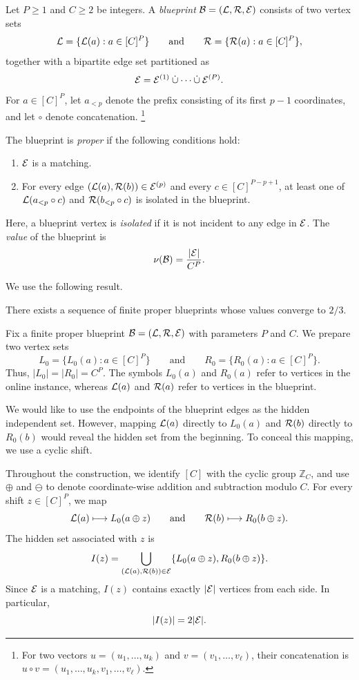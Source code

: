 \begin{definition}
Let $P\ge 1$ and $C\ge 2$ be integers. A \emph{blueprint} $\mathcal{B}=(\mathcal{L},\mathcal{R},\mathcal{E})$ consists of two vertex sets
$$
\mathcal{L}=\{\mathcal{L}(a):a\in[C]^P\}
\qquad\text{and}\qquad
\mathcal{R}=\{\mathcal{R}(a):a\in[C]^P\},
$$
together with a bipartite edge set partitioned as
$$
\mathcal{E}
=
\mathcal{E}^{(1)}
\mathbin{\dot{\cup}}
\cdots
\mathbin{\dot{\cup}}
\mathcal{E}^{(P)}.
$$
For $a\in[C]^P$, let $a_{<p}$ denote the prefix consisting of its first $p-1$ coordinates, and let $\circ$ denote concatenation. \footnote{For two vectors $u=(u_1,\ldots,u_k)$ and $v=(v_1,\ldots,v_\ell)$, their concatenation is $u\circ v=(u_1,\ldots,u_k,v_1,\ldots,v_\ell)$.}

The blueprint is \emph{proper} if the following conditions hold:
\begin{enumerate}
    \item $\mathcal{E}$ is a matching.
    
    \item For every edge $(\mathcal{L}(a),\mathcal{R}(b))\in\mathcal{E}^{(p)}$ and every $c\in[C]^{P-p+1}$, at least one of $\mathcal{L}(a_{<p}\circ c)$ and $\mathcal{R}(b_{<p}\circ c)$ is isolated in the blueprint.
\end{enumerate}
Here, a blueprint vertex is \emph{isolated} if it is not incident to any edge in $\mathcal{E}$. The \emph{value} of the blueprint is
$$
\nu(\mathcal{B})=\frac{|\mathcal{E}|}{C^P}.
$$
\end{definition}

We use the following result.

\begin{theorem}
\label{thm:blueprint}
There exists a sequence of finite proper blueprints whose values converge to $2/3$.
\end{theorem}

Fix a finite proper blueprint $\mathcal{B}=(\mathcal{L},\mathcal{R},\mathcal{E})$ with parameters $P$ and $C$. We prepare two vertex sets
$$
L_0=\{L_0(a):a\in[C]^P\}
\qquad\text{and}\qquad
R_0=\{R_0(a):a\in[C]^P\}.
$$
Thus, $|L_0|=|R_0|=C^P$. The symbols $L_0(a)$ and $R_0(a)$ refer to vertices in the online instance, whereas $\mathcal{L}(a)$ and $\mathcal{R}(a)$ refer to vertices in the blueprint.

We would like to use the endpoints of the blueprint edges as the hidden independent set. However, mapping $\mathcal{L}(a)$ directly to $L_0(a)$ and $\mathcal{R}(b)$ directly to $R_0(b)$ would reveal the hidden set from the beginning. To conceal this mapping, we use a cyclic shift.

Throughout the construction, we identify $[C]$ with the cyclic group $\mathbb{Z}_C$, and use $\oplus$ and $\ominus$ to denote coordinate-wise addition and subtraction modulo $C$. For every shift $z\in[C]^P$, we map
$$
\mathcal{L}(a)\longmapsto L_0(a\oplus z)
\qquad\text{and}\qquad
\mathcal{R}(b)\longmapsto R_0(b\oplus z).
$$
The hidden set associated with $z$ is
$$
I(z)
=
\bigcup_{(\mathcal{L}(a),\mathcal{R}(b))\in\mathcal{E}}
\{L_0(a\oplus z),R_0(b\oplus z)\}.
$$
Since $\mathcal{E}$ is a matching, $I(z)$ contains exactly $|\mathcal{E}|$ vertices from each side. In particular,
$$
|I(z)|=2|\mathcal{E}|.
$$

